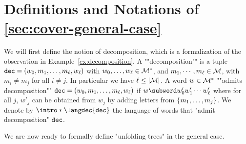 \section{Definitions and Notations of \cref{sec:cover-general-case}}
\label{app:def-trees}
\label{sec:decidability-defs}

We will first define the notion of decomposition, which is a formalization of the observation in Example~\ref{ex:decomposition}. 
A ""decomposition"" is a tuple $\mathtt{dec} = (w_0, m_1, \ldots, m_\ell, w_\ell)$ with $w_0, \ldots, w_\ell \in \mathcal{M}^*$, and $m_1, \cdots, m_\ell \in \mathcal{M}$, with $m_i \neq m_j$ for all $i\neq j$. In particular we have $\ell \leq |\mathcal{M}|$. 
A word $w \in \mathcal{M}^*$ ""admits decomposition"" $\mathtt{dec} = (w_0, m_1, \ldots, m_\ell, w_\ell)$ if $w \subword w'_0 w'_1 \cdots w'_\ell$ where for all $j$, $w'_j$ can be obtained from $w_j$ by adding letters from $\{m_1, \ldots, m_{j}\}$. 
We denote by $\intro*\langdec{\decsymb}$ the language of words that "admit decomposition" $\mathtt{dec}$. 

We are now ready to formally define "unfolding trees" in the general case.

